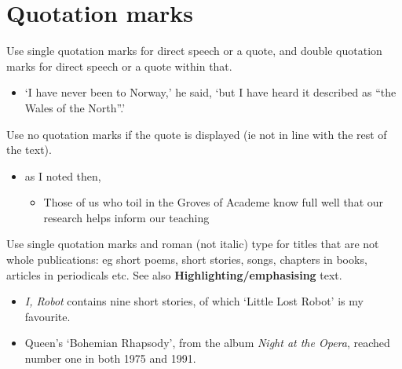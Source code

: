 \documentclass[11pt,a4paper]{book}
\newcommand{\cmark}{{\color{green(html/cssgreen)}\checkmark}}%
\begin{document}
	\section{Quotation marks}
	Use single quotation marks for direct speech or a quote, and double quotation marks for direct speech or a quote within that.
		{\firasans \begin{mdframed}[backgroundcolor=aliceblue] \begin{itemize}[label=\cmark]
			\item `I have never been to Norway,' he said, `but I have heard it described as ``the Wales of the North''.'
		\end{itemize} \end{mdframed} }
	Use no quotation marks if the quote is displayed (ie not in line with the rest of the text).
		{\firasans \begin{mdframed}[backgroundcolor=aliceblue] \begin{itemize}[label=\cmark]
			\item as I noted then,
			\begin{itemize}
				\item[] 
				Those of us who toil in the Groves of Academe know full well that our research helps inform our teaching\textellipsis 
			\end{itemize} 
		\end{itemize} \end{mdframed} }
	Use single quotation marks and roman (not italic) type for titles that are not whole publications: eg short poems, short stories, songs, chapters in books, articles in periodicals etc. See also \textbf{Highlighting/emphasising} text.
		{\firasans \begin{mdframed}[backgroundcolor=aliceblue] \begin{itemize}[label=\cmark]
			\item \textit{I, Robot} contains nine short stories, of which `Little Lost Robot' is my favourite. 
			\item Queen's `Bohemian Rhapsody', from the album \textit{Night at the Opera}, reached number one in both 1975 and 1991.
		\end{itemize} \end{mdframed} }
\end{document}
